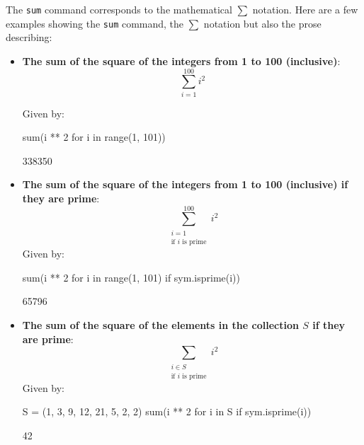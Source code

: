 The \texttt{sum} command corresponds to the mathematical
\(\sum\) notation. Here are a few examples showing the \texttt{sum} command,
the \(\sum\) notation but also the prose describing:

\begin{itemize}
\item 
\textbf{The sum of the square of the integers from 1 to 100 (inclusive)}:
        \[\sum_{i=1}^{100}i ^2\]

        Given by:

\begin{pyin}
sum(i ** 2 for i in range(1, 101))
\end{pyin}

\begin{raw}
338350
\end{raw}

\item
\textbf{The sum of the square of the integers from 1 to 100 (inclusive) if they
are prime}:
\[\sum_{\begin{array}{c}i=1\\\text{if }i\text{ is prime}\end{array}}^{100}i ^2\]
    Given by:
\begin{pyin}
sum(i ** 2 for i in range(1, 101) if sym.isprime(i))
\end{pyin}

\begin{raw}
65796
\end{raw}

\item 
\textbf{The sum of the square of the elements in the collection $S$ if they are
prime}:
\[\sum_{\begin{array}{c}i\in{S}\\\text{if }i\text{ is prime}\end{array}}i ^2\]
Given by:
\begin{pyin}
S = (1, 3, 9, 12, 21, 5, 2, 2)
sum(i ** 2 for i in S if sym.isprime(i))
\end{pyin}

\begin{raw}
42
\end{raw}
\end{itemize}
